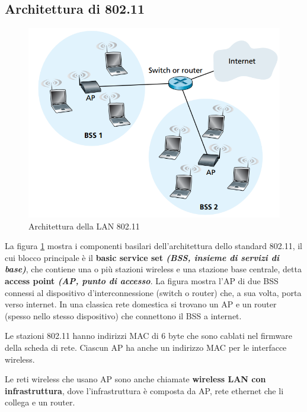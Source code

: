 \documentclass[11pt,a4paper]{book}
\begin{document}
\subsection{Architettura di 802.11}
\begin{figure}
	\includegraphics[scale=0.5]{img/095.png}
	\caption{Architettura della LAN 802.11}
	\label{fig: 095}
\end{figure}
La figura \ref{fig: 095} mostra i componenti basilari dell'architettura dello standard 802.11, il cui blocco principale è il \textbf{basic service set \textit{(BSS, insieme di servizi di base)}}, che contiene una o più stazioni wireless e una stazione base centrale, detta \textbf{access point \textit{(AP, punto di accesso}}. La figura mostra l'AP di due BSS connessi al dispositivo d'interconnessione (switch o router) che, a sua volta, porta verso internet. In una classica rete domestica si trovano un AP e un router (spesso nello stesso dispositivo) che connettono il BSS a internet.

Le stazioni 802.11 hanno indirizzi MAC di 6 byte che sono cablati nel firmware della scheda di rete. Ciascun AP ha anche un indirizzo MAC per le interfacce wireless.

Le reti wireless che usano AP sono anche chiamate \textbf{wireless LAN con infrastruttura}, dove l'infrastruttura è composta da AP, rete ethernet che li collega e un router.
\end{document}
